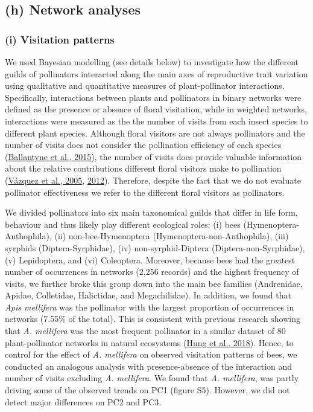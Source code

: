 \documentclass[
  12pt,
  a4paper,
]{article}
\begin{document}
\hypertarget{h-network-analyses}{%
\subsection{(h) Network analyses}\label{h-network-analyses}}

\hypertarget{i-visitation-patterns}{%
\subsubsection{(i) Visitation patterns}\label{i-visitation-patterns}}

We used Bayesian modelling (see details below) to investigate how the different guilds of pollinators interacted along the main axes of reproductive trait variation using qualitative and quantitative measures of plant-pollinator interactions. Specifically, interactions between plants and pollinators in binary networks were defined as the presence or absence of floral visitation, while in weighted networks, interactions were measured as the the number of visits from each insect species to different plant species. Although floral visitors are not always pollinators and the number of visits does not consider the pollination efficiency of each species (\protect\hyperlink{ref-ballantyne2015}{Ballantyne et al., 2015}), the number of visits does provide valuable information about the relative contributions different floral visitors make to pollination (\protect\hyperlink{ref-vazquez2005}{Vázquez et al., 2005}, \protect\hyperlink{ref-vazquez2012}{2012}). Therefore, despite the fact that we do not evaluate pollinator effectiveness we refer to the different floral visitors as pollinators.

We divided pollinators into six main taxonomical guilds that differ in life form, behaviour and thus likely play different ecological roles: (i) bees (Hymenoptera-Anthophila), (ii) non-bee-Hymenoptera (Hymenoptera-non-Anthophila), (iii) syrphids (Diptera-Syrphidae), (iv) non-syrphid-Diptera (Diptera-non-Syrphidae), (v) Lepidoptera, and (vi) Coleoptera. Moreover, because bees had the greatest number of occurrences in networks (2,256 records) and the highest frequency of visits, we further broke this group down into the main bee families (Andrenidae, Apidae, Colletidae, Halictidae, and Megachilidae). In addition, we found that \emph{Apis mellifera} was the pollinator with the largest proportion of occurrences in networks (7.55\% of the total). This is consistent with previous research showing that \emph{A. mellifera} was the most frequent pollinator in a similar dataset of 80 plant-pollinator networks in natural ecosystems (\protect\hyperlink{ref-hung2018}{Hung et al., 2018}). Hence, to control for the effect of \emph{A. mellifera} on observed visitation patterns of bees, we conducted an analogous analysis with presence-absence of the interaction and number of visits excluding \emph{A. mellifera}. We found that \emph{A. mellifera}, was partly driving some of the observed trends on PC1 (figure S5). However, we did not detect major differences on PC2 and PC3.
\end{document}
